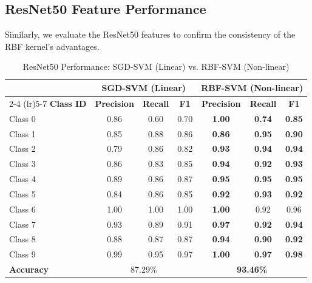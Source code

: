 \subsection{ResNet50 Feature Performance}
Similarly, we evaluate the ResNet50 features to confirm the consistency of the RBF kernel's advantages.

\begin{table}[H]
    \centering
    \caption{ResNet50 Performance: SGD-SVM (Linear) vs. RBF-SVM (Non-linear)}
    \label{tab:resnet_metrics_comparison}
    \begin{tabular}{lcccccc}
        \toprule
        & \multicolumn{3}{c}{\textbf{SGD-SVM (Linear)}} & \multicolumn{3}{c}{\textbf{RBF-SVM (Non-linear)}} \\
        \cmidrule(lr){2-4} \cmidrule(lr){5-7}
        \textbf{Class ID} & \textbf{Precision} & \textbf{Recall} & \textbf{F1} & \textbf{Precision} & \textbf{Recall} & \textbf{F1} \\
        \midrule
        Class 0 & 0.86 & 0.60 & 0.70 & \textbf{1.00} & \textbf{0.74} & \textbf{0.85} \\
        Class 1 & 0.85 & 0.88 & 0.86 & \textbf{0.86} & \textbf{0.95} & \textbf{0.90} \\
        Class 2 & 0.79 & 0.86 & 0.82 & \textbf{0.93} & \textbf{0.94} & \textbf{0.94} \\
        Class 3 & 0.86 & 0.83 & 0.85 & \textbf{0.94} & \textbf{0.92} & \textbf{0.93} \\
        Class 4 & 0.89 & 0.86 & 0.87 & \textbf{0.95} & \textbf{0.95} & \textbf{0.95} \\
        Class 5 & 0.84 & 0.86 & 0.85 & \textbf{0.92} & \textbf{0.93} & \textbf{0.92} \\
        Class 6 & 1.00 & 1.00 & 1.00 & \textbf{1.00} & 0.92 & 0.96 \\
        Class 7 & 0.93 & 0.89 & 0.91 & \textbf{0.97} & \textbf{0.92} & \textbf{0.94} \\
        Class 8 & 0.88 & 0.87 & 0.87 & \textbf{0.94} & \textbf{0.90} & \textbf{0.92} \\
        Class 9 & 0.99 & 0.95 & 0.97 & \textbf{1.00} & \textbf{0.97} & \textbf{0.98} \\
        \midrule
        \textbf{Accuracy} & \multicolumn{3}{c}{87.29\%} & \multicolumn{3}{c}{\textbf{93.46\%}} \\
        \bottomrule
    \end{tabular}
\end{table}

